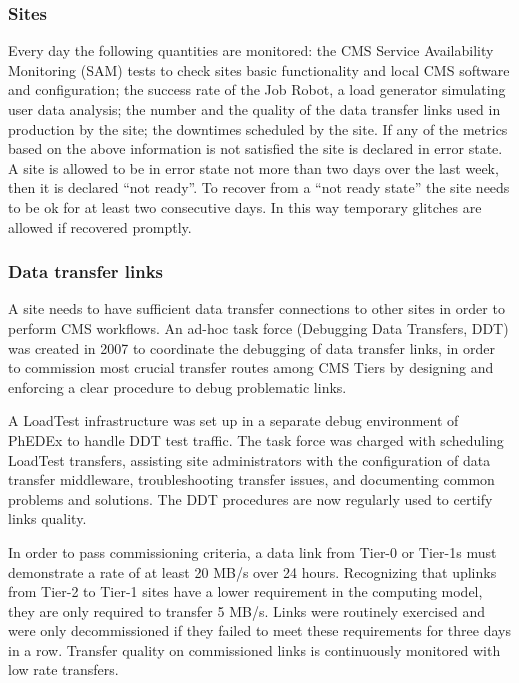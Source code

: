 \subsubsection{ Sites }
\label{sec:4_2_1} 
Every day the following quantities are monitored:
the CMS Service Availability Monitoring (SAM) tests to check sites basic 
functionality and local CMS software and configuration;
the success rate of the Job Robot, a load generator simulating
user data analysis; the number and the quality of the data
transfer links used in production by the site;
the downtimes scheduled by the site.
If any of the metrics based on the above information is not satisfied the site is declared in error state. A site is allowed to be in error state
not more than two days over the last week, then it is declared ``not ready''.
To recover from a ``not ready state'' the site needs to be ok for at least two consecutive days. In this way temporary glitches are allowed if recovered promptly.

\subsubsection{ Data transfer links }
\label{sec:LinkCommissioning}
A site needs to have sufficient data transfer connections to other sites in
order to perform CMS workflows. 
An ad-hoc task force (Debugging Data Transfers, DDT)\cite{RefDDT}
was created in 2007 to coordinate the debugging of data transfer links,
in order to commission most crucial transfer routes among CMS Tiers 
by designing and enforcing a clear procedure to debug problematic links.

A LoadTest infrastructure was set up in a separate debug environment of PhEDEx
to handle DDT test traffic.
The task force was charged with scheduling LoadTest transfers, assisting site
administrators with the configuration of data transfer middleware,
troubleshooting transfer issues, and documenting common problems and solutions.
The DDT procedures are now regularly used to certify links quality.

In order to pass commissioning criteria, a data link from Tier-0 or Tier-1s must
demonstrate a rate of at least 20 MB/s over 24 hours. Recognizing that uplinks
from Tier-2 to Tier-1 sites have a lower requirement in the computing model,
they are only required to transfer 5 MB/s. Links were routinely exercised and
were only decommissioned if they failed to meet these requirements for three
days in a row. Transfer quality on commissioned links is continuously monitored
with low rate transfers.

